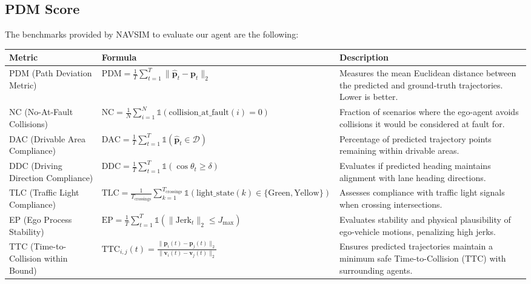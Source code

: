 \documentclass{article}
\begin{document}
\subsection{PDM Score}
The benchmarks provided by NAVSIM to evaluate our agent are the following:
\footnotesize%
\renewcommand{\arraystretch}{1.5} %
\begin{longtable}{|p{2.2cm}|p{4.0cm}|p{7.2cm}|}
\hline
\textbf{Metric} & \textbf{Formula} & \textbf{Description} \\
\hline
PDM (Path Deviation Metric) & 
$\displaystyle \text{PDM} = \frac{1}{T} \sum_{t=1}^T \| \hat{\mathbf{p}}_t - \mathbf{p}_t \|_2$ &
Measures the mean Euclidean distance between the predicted and ground-truth trajectories. Lower is better. \\
\hline
NC (No-At-Fault Collisions) &
$\displaystyle \text{NC} = \frac{1}{N} \sum_{i=1}^N \mathbb{1}\left( \text{collision\_at\_fault}(i) = 0 \right)$ &
Fraction of scenarios where the ego-agent avoids collisions it would be considered at fault for. \\
\hline
DAC (Drivable Area Compliance) &
$\displaystyle \text{DAC} = \frac{1}{T} \sum_{t=1}^T \mathbb{1}\left( \hat{\mathbf{p}}_t \in \mathcal{D} \right)$ &
Percentage of predicted trajectory points remaining within drivable areas. \\
\hline
DDC (Driving Direction Compliance) &
$\displaystyle \text{DDC} = \frac{1}{T} \sum_{t=1}^T \mathbb{1}\left( \cos \theta_t \geq \delta \right)$ &
Evaluates if predicted heading maintains alignment with lane heading directions. \\
\hline
TLC (Traffic Light Compliance) &
$\displaystyle \text{TLC} = \frac{1}{T_{\text{crossings}}} \sum_{k=1}^{T_{\text{crossings}}} \mathbb{1}\left( \text{light\_state}(k) \in \{\text{Green}, \text{Yellow}\} \right)$ &
Assesses compliance with traffic light signals when crossing intersections. \\
\hline
EP (Ego Process Stability) &
$\displaystyle \text{EP} = \frac{1}{T} \sum_{t=1}^T \mathbb{1}\left( \| \text{Jerk}_t \|_2 \leq J_{\text{max}} \right)$ &
Evaluates stability and physical plausibility of ego-vehicle motions, penalizing high jerks. \\
\hline
TTC (Time-to-Collision within Bound) &
$\displaystyle \text{TTC}_{i,j}(t) = \frac{ \| \mathbf{p}_i(t) - \mathbf{p}_j(t) \|_2 }{ \| \mathbf{v}_i(t) - \mathbf{v}_j(t) \|_2 }$ &
Ensures predicted trajectories maintain a minimum safe Time-to-Collision (TTC) with surrounding agents. \\

\end{longtable}
\end{document}
